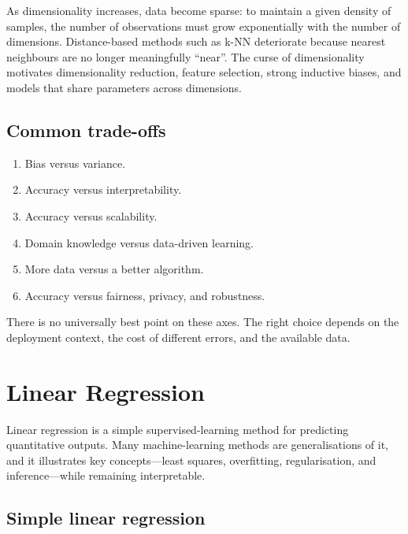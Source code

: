 \documentclass[a4paper, 12pt]{book}
\begin{document}
As dimensionality increases, data become sparse: to maintain a given density of
samples, the number of observations must grow exponentially with the number of
dimensions. Distance-based methods such as k-NN deteriorate because nearest
neighbours are no longer meaningfully ``near''. The curse of dimensionality motivates
dimensionality reduction, feature selection, strong inductive biases, and models that
share parameters across dimensions.

\section{Common trade-offs}

\begin{enumerate}
    \item Bias versus variance.
    \item Accuracy versus interpretability.
    \item Accuracy versus scalability.
    \item Domain knowledge versus data-driven learning.
    \item More data versus a better algorithm.
    \item Accuracy versus fairness, privacy, and robustness.
\end{enumerate}
There is no universally best point on these axes. The right choice depends on the
deployment context, the cost of different errors, and the available data.

\chapter{Linear Regression}
\label{ch:linear}

Linear regression is a simple supervised-learning method for predicting quantitative
outputs. Many machine-learning methods are generalisations of it, and it illustrates
key concepts---least squares, overfitting, regularisation, and inference---while
remaining interpretable.

\section{Simple linear regression}
\end{document}
